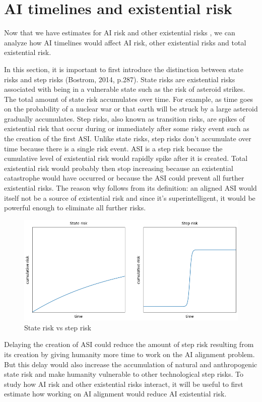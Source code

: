 \documentclass{article}
\begin{document}
\section{AI timelines and existential risk}

Now that we have estimates for AI risk and other existential risks \cite{theprecipice}, we can analyze how AI timelines would affect AI risk, other existential risks and total existential risk.

In this section, it is important to first introduce the distinction between state risks and step risks (Bostrom, 2014, p.287). State risks are existential risks associated with being in a vulnerable state such as the risk of asteroid strikes. The total amount of state risk accumulates over time. For example, as time goes on the probability of a nuclear war or that earth will be struck by a large asteroid gradually accumulates. Step risks, also known as transition risks, are spikes of existential risk that occur during or immediately after some risky event such as the creation of the first ASI. Unlike state risks, step risks don’t accumulate over time because there is a single risk event. ASI is a step risk because the cumulative level of existential risk would rapidly spike after it is created. Total existential risk would probably then stop increasing because an existential catastrophe would have occurred or because the ASI could prevent all further existential risks. The reason why follows from its definition: an aligned ASI would itself not be a source of existential risk and since it's superintelligent, it would be powerful enough to eliminate all further risks.

\begin{figure}[h]
\includegraphics[width=12cm]{step-risk-vs-state-risk}
\centering
\caption{State risk vs step risk}
\end{figure}

Delaying the creation of ASI could reduce the amount of step risk resulting from its creation by giving humanity more time to work on the AI alignment problem. But this delay would also increase the accumulation of natural and anthropogenic state risk and make humanity vulnerable to other technological step risks. To study how AI risk and other existential risks interact, it will be useful to first estimate how working on AI alignment would reduce AI existential risk.
\end{document}
